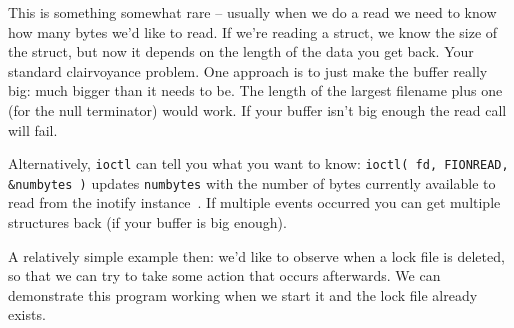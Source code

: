 \documentclass[a4paper]{report}
\begin{document}
This is something somewhat rare -- usually when we do a read we need to know how many bytes we'd like to read. If we're reading a struct, we know the size of the struct, but now it depends on the length of the data you get back. Your standard clairvoyance problem. One approach is to just make the buffer really big: much bigger than it needs to be. The length of the largest filename plus one (for the null terminator) would work. If your buffer isn't big enough the read call will fail.

Alternatively, \texttt{ioctl} can tell you what you want to know: \texttt{ioctl( fd, FIONREAD, \&numbytes )} updates \texttt{numbytes} with the number of bytes currently available to read from the inotify instance~\cite{lpi}.  If multiple events occurred you can get multiple structures back (if your buffer is big enough).

A relatively simple example then: we'd like to observe when a lock file is deleted, so that we can try to take some action that occurs afterwards. We can demonstrate this program working when we start it and the lock file already exists.
\end{document}
